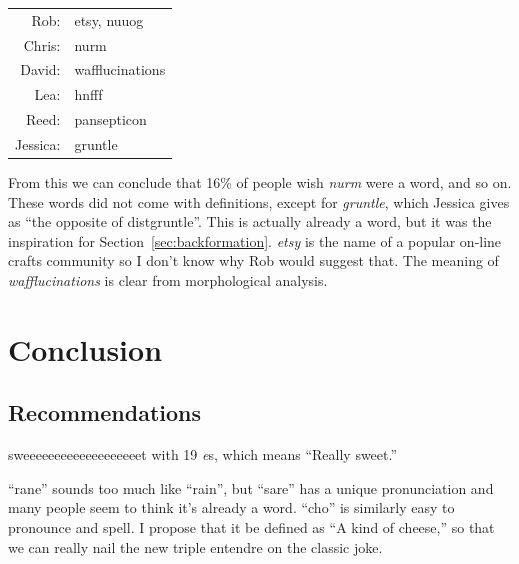 \documentclass[twocolumn]{article}
\begin{document}
\begin{center}
\begin{tabular}{rl}
Rob: &  etsy, nuuog \\
Chris: &  nurm \\
David: &  wafflucinations \\
Lea: &  hnfff \\
Reed: &  pansepticon \\
Jessica: &  gruntle \\
\end{tabular}
\end{center}

From this we can conclude that 16\% of people wish {\it nurm} were a word, and so on.
These words did not come with definitions, except for {\it gruntle}, which Jessica
gives as ``the opposite of distgruntle''. This is actually already a word, but
it was the inspiration for Section~\ref{sec:backformation}. {\it etsy} is the name
of a popular on-line crafts community so I don't know why Rob would suggest that.
The meaning of {\it wafflucinations} is clear from morphological analysis.







\section{Conclusion}

\subsection{Recommendations}

sweeeeeeeeeeeeeeeeeeet with 19 {\it e}s, which means ``Really sweet.''

``rane'' sounds too much like ``rain'', but ``sare'' has a unique pronunciation and many people seem to think it's already a word. ``cho'' is similarly easy to pronounce and spell. I propose that it be defined as ``A kind of cheese,'' so that we can really nail the new triple entendre on the classic joke.
\end{document}
